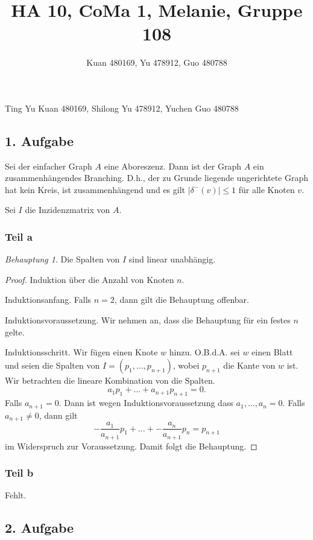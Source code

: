 \documentclass[fleqn,draft,a5paper]{article}
\title{HA 10, CoMa 1, Melanie, Gruppe 108}
\author{Kuan 480169, Yu 478912, Guo 480788}
\providecommand{\abs}[1]{\left\lvert#1\right\rvert}
\theoremstyle{remark}
\newtheorem*{Behauptung}{Behauptung}
\begin{document}
\maketitle
\begin{center}
Ting Yu Kuan 480169, Shilong Yu 478912, Yuchen Guo 480788
\end{center}
\newpage
\subsection{1. Aufgabe}
Sei der einfacher Graph \(A\) eine Aboreszenz.  Dann ist der Graph
\(A\) ein zusammenhängendes Branching. D.h., der zu Grunde liegende
ungerichtete Graph hat kein Kreis, ist zusammenhängend und es gilt
\(\abs{\delta^{-}(v)} \le 1\) für alle Knoten \(v\).

Sei \(I\) die Inzidenzmatrix von \(A\).
\subsubsection{Teil a}
\begin{Behauptung}
  Die Spalten von \(I\) sind linear unabhängig.
\end{Behauptung}
\begin{proof}
  Induktion über die Anzahl von Knoten \(n\).

  Induktionsanfang. Falls \(n = 2\), dann gilt
  die Behauptung offenbar.

  Induktionsvoraussetzung. Wir nehmen an, dass die Behauptung für ein
  festes \(n\) gelte.

  Induktionsschritt.  Wir fügen einen Knote \(w\) hinzu.  O.B.d.A. sei
  \(w\) einen Blatt und seien die Spalten von \(I = (p_{1}, \ldots, p_{n+1})\),
  wobei \(p_{n+1}\) die Kante von \(w\) ist.  Wir betrachten die lineare
  Kombination von die Spalten.
  \[
    a_{1}p_{1} + \ldots + a_{n+1}p_{n+1} = 0.
  \]
  Falls \(a_{n+1} = 0\).  Dann ist wegen Induktionsvoraussetzung dass
  \(a_{1}, \ldots, a_{n} = 0\).  Falls \(a_{n+1} \ne 0\), dann gilt
  \[
    -\frac{a_{1}}{a_{n+1}}p_{1} + \ldots + -\frac{a_{n}}{a_{n+1}}p_{n} = p_{n+1}
  \]
  im Widerspruch zur Voraussetzung.  Damit folgt die Behauptung.
\end{proof}
\subsubsection{Teil b}
Fehlt.

\subsection{2. Aufgabe}
\end{document}
